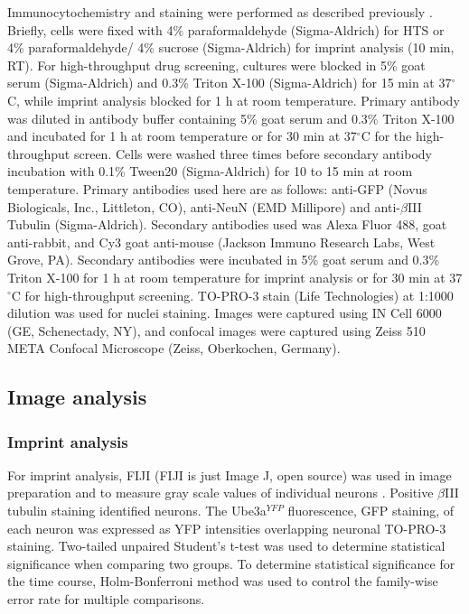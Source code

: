 Immunocytochemistry and staining were performed as described previously \cite{Watase2002}. Briefly, cells were fixed with 4\% paraformaldehyde (Sigma-Aldrich) for HTS or 4\% paraformaldehyde/ 4\% sucrose (Sigma-Aldrich) for imprint analysis (10 min, RT). For high-throughput drug screening, cultures were blocked in 5\% goat serum (Sigma-Aldrich) and 0.3\% Triton X-100 (Sigma-Aldrich) for 15 min at 37$^{\circ}$C, while imprint analysis blocked for 1 h at room temperature. Primary antibody was diluted in antibody buffer containing 5\% goat serum and 0.3\% Triton X-100 and incubated for 1 h at room temperature or for 30 min at 37$^{\circ}$C for the high-throughput screen. Cells were washed three times before secondary antibody incubation with 0.1\% Tween20 (Sigma-Aldrich) for 10 to 15 min at room temperature. Primary antibodies used here are as follows: anti-GFP (Novus Biologicals, Inc., Littleton, CO), anti-NeuN (EMD Millipore) and anti-$\beta$III Tubulin (Sigma-Aldrich). Secondary antibodies used was Alexa Fluor 488, goat anti-rabbit, and Cy3 goat anti-mouse (Jackson Immuno Research Labs, West Grove, PA). Secondary antibodies were incubated in 5\% goat serum and 0.3\% Triton X-100 for 1 h at room temperature for imprint analysis or for 30 min at 37$^{\circ}$C for high-throughput screening. TO-PRO-3 stain (Life Technologies) at 1:1000 dilution was used for nuclei staining. Images were captured using IN Cell 6000 (GE, Schenectady, NY), and confocal images were captured using Zeiss 510 META Confocal Microscope (Zeiss, Oberkochen, Germany). 
\subsection{Image analysis}
\subsubsection*{Imprint analysis}

For imprint analysis, FIJI (FIJI is just Image J, open source) was used in image preparation and to measure gray scale values of individual neurons \cite{Schindelin2012,Schneider2012}. Positive \( \beta \)III tubulin staining identified neurons. The Ube3a$^{YFP}$ fluorescence, GFP staining, of each neuron was expressed as YFP intensities overlapping neuronal TO-PRO-3 staining. Two-tailed unpaired Student's t-test was used to determine statistical significance when comparing two groups. To determine statistical significance for the time course, Holm-Bonferroni method was used to control the family-wise error rate for multiple comparisons.

